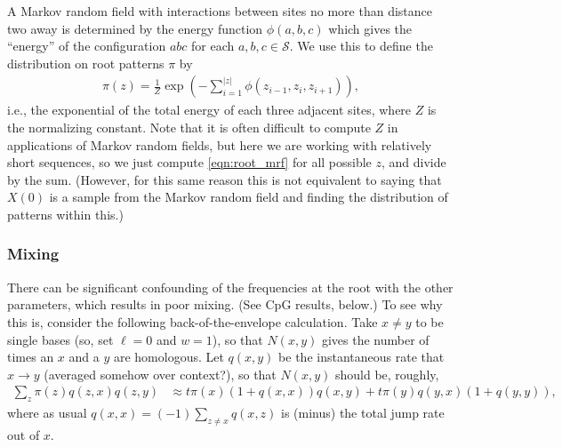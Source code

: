 \documentclass{article}
\newcommand{\calS}{\mathcal{S}}  %
\theoremstyle{plain}
\theoremstyle{definition}
\begin{document}
A Markov random field with interactions between sites no more than distance two away
is determined by the energy function $\phi(a,b,c)$ which gives the ``energy'' of the configuration $abc$ for each $a,b,c \in \calS$.
We use this to define the distribution on root patterns $\pi$ by
\begin{align}  \label{eqn:root_mrf}
    \pi(z) = \frac{1}{Z} \exp\left( - \sum_{i=1}^{|z|} \phi(z_{i-1},z_i,z_{i+1}) \right),
\end{align}
i.e., the exponential of the total energy of each three adjacent sites,
where $Z$ is the normalizing constant.
Note that it is often difficult to compute $Z$ in applications of Markov random fields,
but here we are working with relatively short sequences,
so we just compute \eqref{eqn:root_mrf} for all possible $z$, and divide by the sum.
(However, for this same reason this is not equivalent to saying that $X(0)$ is a sample from the Markov random field
and finding the distribution of patterns within this.)


\subsubsection{Mixing}

There can be significant confounding of the frequencies at the root with the other parameters,
which results in poor mixing.
(See CpG results, below.)
To see why this is, consider the following back-of-the-envelope calculation.
Take $x \neq y$ to be single bases (so, set $\ell=0$ and $w=1$),
so that $N(x,y)$ gives the number of times an $x$ and a $y$ are homologous.
Let $q(x,y)$ be the instantaneous rate that $x \to y$ (averaged somehow over context?),
so that $N(x,y)$ should be, roughly,
\begin{align*}
  \sum_z \pi(z) q(z,x) q(z,y) &\approx t \pi(x) (1+q(x,x)) q(x,y) + t \pi(y) q(y,x) (1+q(y,y)) ,
\end{align*}
where as usual $q(x,x) = (-1) \sum_{z \neq x} q(x,z)$ is (minus) the total jump rate out of $x$.
\end{document}
